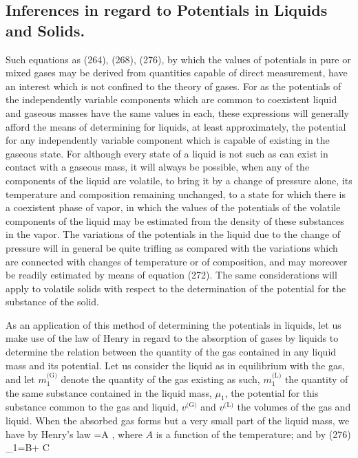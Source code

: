 \documentclass[12pt]{article}
\begin{document}
\subsection{Inferences in regard to Potentials in Liquids and Solids.}
Such equations as (264), (268), (276), by which the values of potentials in pure or mixed gases may be derived from quantities capable of direct measurement, have an interest which is not confined to the theory of gases. For as the potentials of the independently variable components which are common to coexistent liquid and gaseous masses have the same values in each, these expressions will generally afford the means of determining for liquids, at least approximately, the potential for any independently variable component which is capable of existing in the gaseous state. For although every state of a liquid is not such as can exist in contact with a gaseous mass, it will always be possible, when any of the components of the liquid are volatile, to bring it by a change of pressure alone, its temperature and composition remaining unchanged, to a state for which there is a coexistent phase of vapor, in which the values of the potentials of the volatile components of the liquid may be estimated from the density of these substances in the vapor. The variations of the potentials in the liquid due to the change of pressure will in general be quite trifling as compared with the variations which are connected with changes of temperature or of composition, and may moreover be readily estimated by means of equation (272). The same considerations will apply to volatile solids with respect to the determination of the potential for the substance of the solid.


As an application of this method of determining the potentials in liquids, let us make use of the law of Henry in regard to the absorption of gases by liquids to determine the relation between the quantity of the gas contained in any liquid mass and its potential. Let us consider the liquid as in equilibrium with the gas, and let $m_1^\text{(G)}$ denote the quantity of the gas existing as such, $m_1^\text{(L)}$ the quantity of the same substance contained in the liquid mass, $\mu_1$, the potential for this substance common to the gas and liquid, $v^\text{(G)}$ and $v^\text{(L)}$ the volumes of the gas and liquid. When the absorbed gas forms but a very small part of the liquid mass, we have by Henry's law
\eqs {}=A ,      \label{294}\eqe
where $A$ is a function of the temperature; and by (276)
\eqs \mu_1=B+ C \log {}   \label{295}\eqe
\end{document}
